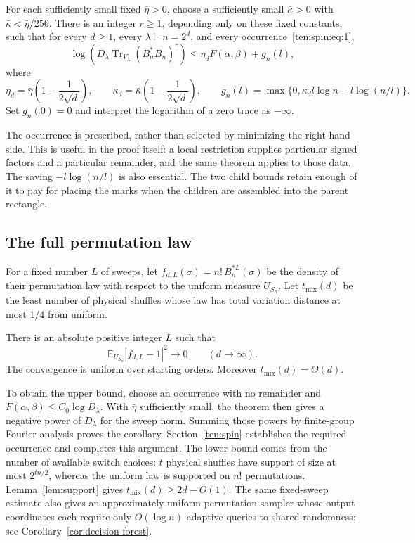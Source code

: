 \begin{theorem}
\label{ten:spin:main}\label{s:spin-moment}
For each sufficiently small fixed $\bar\eta>0$, choose a sufficiently
small $\bar\kappa>0$ with $\bar\kappa<\bar\eta/256$. There is an
integer $r\ge1$, depending only on these fixed constants, such that for
every $d\ge1$, every $\lambda\vdash n=2^d$, and every
occurrence~\eqref{ten:spin:eq:1},
\begin{equation}\label{ten:spin:eq:3}
 \log\!\left(D_\lambda\operatorname{Tr}_{V_\lambda}(B_n^*B_n)^r\right)
 \le\eta_d F(\alpha,\beta)+g_n(l),
\end{equation}
where
\[
 \eta_d=\bar\eta\left(1-\frac1{2\sqrt d}\right),\qquad
 \kappa_d=\bar\kappa\left(1-\frac1{2\sqrt d}\right),\qquad
 g_n(l)=\max\{0,\kappa_d l\log n-l\log(n/l)\}.
\]
Set $g_n(0)=0$ and interpret the logarithm of a zero trace as $-\infty$.
\end{theorem}

The occurrence is prescribed, rather than selected by minimizing the
right-hand side. This is useful in the proof itself: a local restriction
supplies particular signed factors and a particular remainder, and the
same theorem applies to those data. The saving $-l\log(n/l)$ is also
essential. The two child bounds retain enough of it to pay for placing
the marks when the children are assembled into the parent rectangle.

\subsection*{The full permutation law}
For a fixed number $L$ of sweeps, let
$f_{d,L}(\sigma)=n!\,B_n^{*L}(\sigma)$ be the density of their
permutation law with respect to the uniform measure $U_{S_n}$.
Let $t_{\mathrm{mix}}(d)$ be the least number of physical shuffles
whose law has total variation distance at most $1/4$ from uniform.

\begin{corollary}
\label{cor:spin-full-deck}
There is an absolute positive integer $L$ such that
\[
 \mathbb E_{U_{S_n}}|f_{d,L}-1|^2\longrightarrow0
 \qquad(d\longrightarrow\infty).
\]
The convergence is uniform over starting orders. Moreover
$t_{\mathrm{mix}}(d)=\Theta(d)$.
\end{corollary}

To obtain the upper bound, choose an occurrence with no remainder and
$F(\alpha,\beta)\le C_0\log D_\lambda$. With $\bar\eta$ sufficiently
small, the theorem then gives a negative power of $D_\lambda$ for the
sweep norm. Summing those powers by finite-group Fourier analysis proves
the corollary. Section~\ref{ten:spin} establishes the required occurrence
and completes this argument. The lower bound comes from the number of
available switch choices: $t$ physical shuffles have support of size at
most $2^{tn/2}$, whereas the uniform law is supported on $n!$ permutations.
Lemma~\ref{lem:support} gives $t_{\mathrm{mix}}(d)\ge2d-O(1)$. The
same fixed-sweep estimate also gives an approximately uniform permutation
sampler whose output coordinates each require only $O(\log n)$ adaptive
queries to shared randomness; see Corollary~\ref{cor:decision-forest}.

